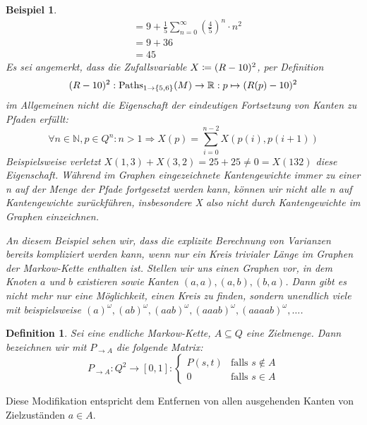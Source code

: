 \documentclass[a4paper]{article}
\newcommand{\mc}{Markow-Kette}
\newtheorem{beispiel}[satz]{Beispiel}
\newtheorem{definition}[satz]{Definition} %
\theoremstyle{nonumberplain}
\begin{document}
\begin{beispiel}
\begin{align*}
		& = 9 + \frac{1}{5}\sum_{n = 0}^{\infty}{\left(\frac{4}{5}\right)^n \cdot n^2} \\
		& = 9 + 36 \\
		& = 45
	\end{align*}
	Es sei angemerkt, dass die Zufallsvariable $X \coloneqq (R-10)^2$, per Definition
	\[
	(R-10)^2 : \mathrm{Paths}_{1 \rightarrow \{5,6\}}(M) \to  \mathbb{R} : p \mapsto (R(p) - 10)^2
	\]
	im Allgemeinen nicht die Eigenschaft der eindeutigen Fortsetzung von Kanten zu Pfaden erfüllt:
	\[
	\forall n \in \mathbb{N}, p \in Q^n : n>1 \Rightarrow X(p) = \sum_{i=0}^{n-2}{X(p(i),p(i+1))}
	\]
	Beispielsweise verletzt $X(1,3) + X(3,2) = 25 + 25 \neq 0 = X(132)$ diese Eigenschaft. Während im Graphen eingezeichnete Kantengewichte immer zu einer \rvar{}n auf der Menge der Pfade fortgesetzt werden kann, können wir nicht alle \rvar{}n auf Kantengewichte zurückführen, insbesondere X also nicht durch Kantengewichte im Graphen einzeichnen.
	
	
	An diesem Beispiel sehen wir, dass die explizite Berechnung von Varianzen bereits kompliziert werden kann, wenn nur ein Kreis trivialer Länge im Graphen der \mc{} enthalten ist. Stellen wir uns einen Graphen vor, in dem Knoten $a$ und $b$ existieren sowie Kanten $(a,a), (a,b), (b,a)$. Dann gibt es nicht mehr nur eine Möglichkeit, einen Kreis zu finden, sondern unendlich viele mit beispielsweise $(a)^\omega, (ab)^\omega, (aab)^\omega, (aaab)^\omega, (aaaab)^\omega,\dots$\;.
\end{beispiel}

\begin{definition}\label{def-pmod}
	Sei \mcex{} eine endliche \mc, $A\subseteq Q$ eine Zielmenge. Dann bezeichnen wir mit $P_{\rightarrow A}$ die folgende Matrix:
	\begin{equation}
	P_{\rightarrow A} : Q^2 \to [0,1] : \begin{cases}
	P(s,t) & \text{falls } s\notin A\\
	0 & \text{falls } s\in A
	\end{cases}
	\end{equation}
\end{definition}

Diese Modifikation entspricht dem Entfernen von allen ausgehenden Kanten von Zielzuständen $a\in A$.
\end{document}
